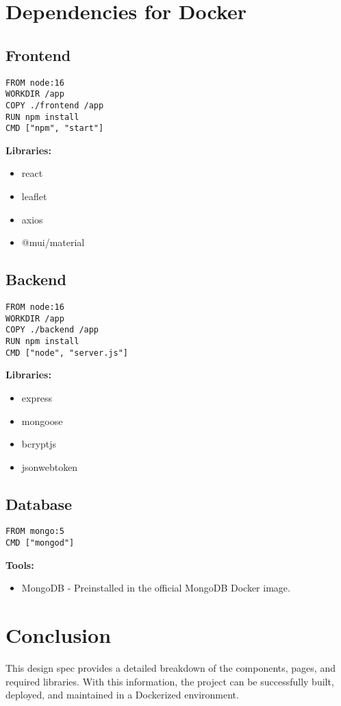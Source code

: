 \documentclass{article}
\begin{document}
\section{Dependencies for Docker}

\subsection{Frontend}
\begin{verbatim}
FROM node:16
WORKDIR /app
COPY ./frontend /app
RUN npm install
CMD ["npm", "start"]
\end{verbatim}

\textbf{Libraries:}
\begin{itemize}
    \item react
    \item leaflet
    \item axios
    \item @mui/material
\end{itemize}

\subsection{Backend}
\begin{verbatim}
FROM node:16
WORKDIR /app
COPY ./backend /app
RUN npm install
CMD ["node", "server.js"]
\end{verbatim}

\textbf{Libraries:}
\begin{itemize}
    \item express
    \item mongoose
    \item bcryptjs
    \item jsonwebtoken
\end{itemize}

\subsection{Database}
\begin{verbatim}
FROM mongo:5
CMD ["mongod"]
\end{verbatim}

\textbf{Tools:}
\begin{itemize}
    \item MongoDB - Preinstalled in the official MongoDB Docker image.
\end{itemize}

\section*{Conclusion}
This design spec provides a detailed breakdown of the components, pages, and required libraries. With this information, the project can be successfully built, deployed, and maintained in a Dockerized environment.
\end{document}

